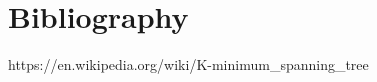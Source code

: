 \documentclass[spanish,12pt]{elsarticle}
\begin{document}


\appendix
\section*{Bibliography}




\begin{thebibliography}{00}
https://en.wikipedia.org/wiki/K-minimum\_spanning\_tree


\end{thebibliography}
\end{document}

